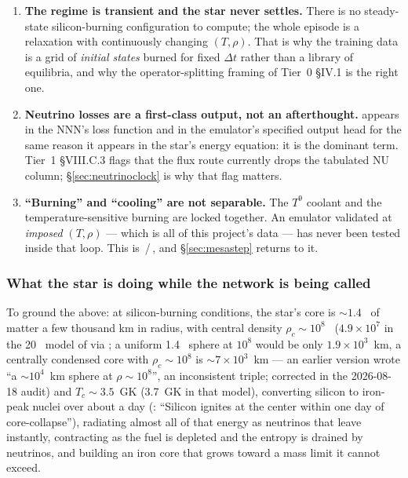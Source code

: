 \begin{enumerate}
\item \textbf{The regime is transient and the star never settles.} There is no
  steady-state silicon-burning configuration to compute; the whole episode is a
  relaxation with continuously changing $(T, \rho)$. That is why the training
  data is a grid of \emph{initial states} burned for fixed $\Delta t$ rather
  than a library of equilibria, and why the operator-splitting framing of
  Tier~0 \S IV.1 is the right one.
\item \textbf{Neutrino losses are a first-class output, not an afterthought.}
  \epsnu{} appears in the NNN's loss function and in the emulator's specified
  output head for the same reason it appears in the star's energy equation: it
  is the dominant term. Tier~1 \S VIII.C.3 flags that the flux route currently
  drops the tabulated NU column; \S\ref{sec:neutrinoclock} is why that flag
  matters.
\item \textbf{``Burning'' and ``cooling'' are not separable.} The $T^9$ coolant
  and the temperature-sensitive burning are locked together. An emulator
  validated at \emph{imposed} $(T, \rho)$ --- which is all of this project's
  data --- has never been tested inside that loop. This is
  \,/\,, and \S\ref{sec:mesastep}
  returns to it.
\end{enumerate}

\subsubsection{What the star is doing while the network is being called}
\label{sec:whilecalled}

To ground the above: at silicon-burning conditions, the star's core is
${\sim}1.4$~\Msun{} of matter a few thousand km in radius, with central density
$\rho_c \sim 10^8$~\gcc{} ($4.9 \times 10^7$ in the 20~\Msun{} model of
\citealt{arnett1989} via \citealt{odrzywolek2004}; a uniform 1.4~\Msun{} sphere
at $10^8$ would be only $1.9 \times 10^3$~km, a centrally condensed core with
$\rho_c \sim 10^8$ is ${\sim}7 \times 10^3$~km --- an earlier version wrote ``a
${\sim}10^4$~km sphere at $\rho \sim 10^8$'', an inconsistent triple; corrected
in the 2026-08-18 audit) and $T_c \sim 3.5$~GK (3.7~GK in that model),
converting silicon to iron-peak nuclei over about a day
(\citealt{farmer2016}: ``Silicon ignites at the center within one day of
core-collapse''), radiating almost all of that energy as neutrinos that leave
instantly, contracting as the fuel is depleted and the entropy is drained by
neutrinos, and building an iron core that grows toward a mass limit it cannot
exceed.


